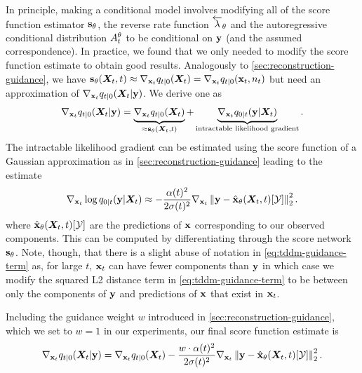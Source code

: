 In principle, making a conditional model involves modifying all of the score function estimator ${\mathbf{s}}_\theta$, the reverse rate function $\overleftarrow{\lambda}_\theta$ and the autoregressive conditional distribution $A_t^\theta$ to be conditional on ${\mathbf{y}}$ (and the assumed correspondence). In practice, we found that we only needed to modify the score function estimate to obtain good results. Analogously to \cref{sec:reconstruction-guidance}, we have ${\mathbf{s}}_\theta({\bm{X}}_t, t) \approx \nabla_{{\mathbf{x}}_t} q_{t|0} ({\bm{X}}_t) = \nabla_{{\mathbf{x}}_t} q_{t|0} ({\mathbf{x}}_t, n_t)$ but need an approximation of $\nabla_{{\mathbf{x}}_t} q_{t|0} ({\bm{X}}_t | {\mathbf{y}} )$. We derive one as
\begin{align}
    \nabla_{{\mathbf{x}}_t} q_{t|0} ({\bm{X}}_t | {\mathbf{y}} ) = \underbrace{\nabla_{{\mathbf{x}}_t} q_{t|0} ({\bm{X}}_t)}_{\approx {\mathbf{s}}_\theta({\bm{X}}_t, t)} + \underbrace{\nabla_{{\mathbf{x}}_t} q_{0|t} ({\mathbf{y}} | {\bm{X}}_t)}_\text{intractable likelihood gradient}.
\end{align}
The intractable likelihood gradient can be estimated using the score function of a Gaussian approximation as in \cref{sec:reconstruction-guidance} leading to the estimate
\begin{equation} \label{eq:tddm-guidance-term}
    \nabla_{{\mathbf{x}}_t} \log q_{0|t}({\mathbf{y}} | {\bm{X}}_t) \approx - \frac{\alpha(t)^2}{2\sigma(t)^2} \nabla_{{\mathbf{x}}_t} \left\lVert{\mathbf{y}} - \hat{{\mathbf{x}}}_\theta({\bm{X}}_t, t)[{\mathcal{Y}}] \right\rVert^2_2.
\end{equation}
where $\hat{{\mathbf{x}}}_\theta({\bm{X}}_t, t)[{\mathcal{Y}}]$ are the predictions of ${\mathbf{x}}$ corresponding to our observed components. This can be computed by differentiating through the score network ${\mathbf{s}}_\theta$.  Note, though, that there is a slight abuse of notation in \cref{eq:tddm-guidance-term} as, for large $t$, ${\mathbf{x}}_t$ can have fewer components than ${\mathbf{y}}$ in which case we modify the squared L2 distance term in \cref{eq:tddm-guidance-term} to be between only the components of ${\mathbf{y}}$ and predictions of ${\mathbf{x}}$ that exist in ${\mathbf{x}}_t$.

Including the guidance weight $w$ introduced in \cref{sec:reconstruction-guidance}, which we set to $w = 1$ in our experiments, our final score function estimate is
\begin{equation} \label{eq:tddm-guidance-score}
    \nabla_{{\mathbf{x}}_t} q_{t|0} ({\bm{X}}_t | {\mathbf{y}} ) = \nabla_{{\mathbf{x}}_t} q_{t|0} ({\bm{X}}_t) - \frac{w \cdot \alpha(t)^2}{2\sigma(t)^2} \nabla_{{\mathbf{x}}_t} \left\lVert{\mathbf{y}} - \hat{{\mathbf{x}}}_\theta({\bm{X}}_t, t)[{\mathcal{Y}}] \right\rVert^2_2.
\end{equation}

